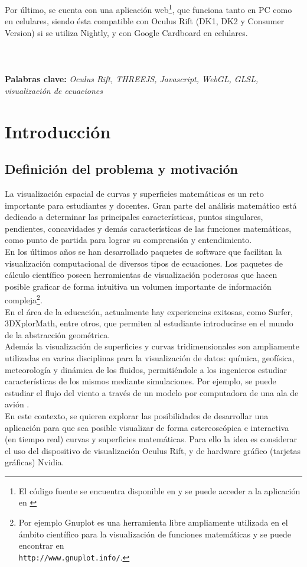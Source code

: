 \documentclass[12pt]{article}
\begin{document}
Por último, se cuenta con una aplicación web\footnote{El código fuente se encuentra disponible en \cite{nuestrocodigo} y se puede acceder a la aplicación en \cite{nuestrositio}}, que funciona  tanto en PC como en celulares, siendo ésta compatible con Oculus Rift (DK1, DK2 y Consumer Version) si se utiliza Nightly, y con Google Cardboard en celulares.
\\
\\
\\
\\
\textbf{Palabras clave:} \textit{Oculus Rift, THREEJS, Javascript, WebGL, GLSL, visualización de ecuaciones} 


\clearpage
\tableofcontents
\clearpage
\section{Introducción}

\subsection{Definición del problema y motivación}
La visualización espacial de curvas y superficies matemáticas es un reto importante para estudiantes y docentes. Gran parte del análisis matemático está dedicado a determinar las principales características, puntos singulares, pendientes, concavidades y demás características de las  funciones matemáticas, como punto de partida para lograr su comprensión y entendimiento.
\\En los últimos años se han desarrollado paquetes de software que facilitan la visualización computacional de diversos tipos de ecuaciones. Los paquetes de cálculo científico poseen herramientas de visualización poderosas que hacen posible graficar de forma intuitiva un volumen importante de información compleja\footnote{Por ejemplo Gnuplot es una herramienta libre ampliamente utilizada en el ámbito científico para la visualización de funciones matemáticas y se puede encontrar en \\\texttt{http://www.gnuplot.info/}\cite{gnuplot}.}.  
\\En el área de la educación, actualmente hay experiencias exitosas, como Surfer\cite{surfer}, 3DXplorMath\cite{dxplormath}, entre otros, que permiten al estudiante introducirse en el mundo de la abstracción geométrica. 
\\Además la visualización de superficies y curvas tridimensionales son ampliamente utilizadas en varias disciplinas para la visualización de datos: química, geofísica, meteorología y dinámica de los fluidos, permitiéndole a los ingenieros estudiar características de los mismos mediante simulaciones. Por ejemplo, se puede estudiar el flujo del viento a través de un modelo por computadora de una ala de avión \cite{aircraftwing}. 
\\En este contexto, se quieren explorar las posibilidades de desarrollar una aplicación para que sea posible visualizar de forma estereoscópica e interactiva (en tiempo real) curvas y superficies matemáticas. Para ello la idea es considerar el uso del dispositivo de visualización Oculus Rift, y de hardware gráfico (tarjetas gráficas) Nvidia.
\end{document}

